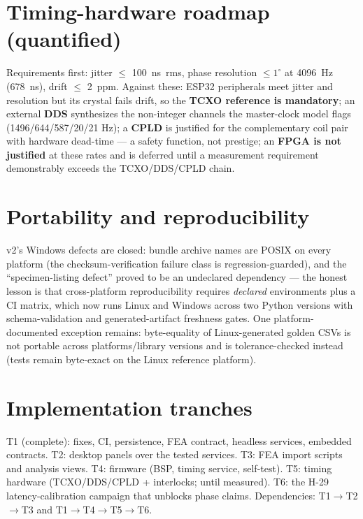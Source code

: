 \documentclass[10pt,letterpaper]{article}
\begin{document}
\section{Timing-hardware roadmap (quantified)}
Requirements first: jitter $\leq$ \SI{100}{\nano\second}~rms, phase
resolution $\leq 1^\circ$ at \SI{4096}{\hertz} (\SI{678}{\nano\second}),
drift $\leq$ \SI{2}{ppm}. Against these: ESP32 peripherals meet jitter
and resolution but its crystal fails drift, so the \textbf{TCXO
reference is mandatory}; an external \textbf{DDS} synthesizes the
non-integer channels the master-clock model flags (1496/644/587/20/21
\si{\hertz}); a \textbf{CPLD} is justified for the complementary coil
pair with hardware dead-time --- a safety function, not prestige; an
\textbf{FPGA is not justified} at these rates and is deferred until a
measurement requirement demonstrably exceeds the TCXO/DDS/CPLD chain.

\section{Portability and reproducibility}
v2's Windows defects are closed: bundle archive names are POSIX on every
platform (the checksum-verification failure class is regression-guarded),
and the ``specimen-listing defect'' proved to be an undeclared dependency
--- the honest lesson is that cross-platform reproducibility requires
\emph{declared} environments plus a CI matrix, which now runs Linux and
Windows across two Python versions with schema-validation and
generated-artifact freshness gates. One platform-documented exception
remains: byte-equality of Linux-generated golden CSVs is not portable
across platforms/library versions and is tolerance-checked instead
(tests remain byte-exact on the Linux reference platform).

\section{Implementation tranches}
T1 (complete): fixes, CI, persistence, FEA contract, headless services,
embedded contracts. T2: desktop panels over the tested services. T3:
FEA import scripts and analysis views. T4: firmware (BSP, timing
service, self-test). T5: timing hardware (TCXO/DDS/CPLD + interlocks;
\ENG{} until measured). T6: the H-29 latency-calibration campaign that
unblocks phase claims. Dependencies: T1$\to$T2$\to$T3 and
T1$\to$T4$\to$T5$\to$T6.
\end{document}
